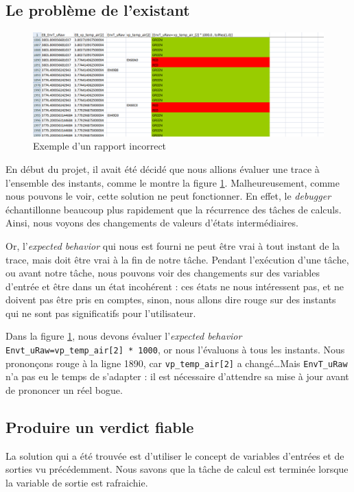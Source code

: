 \subsection{Le problème de l'existant}
\begin{figure}[H]
\centering
\includegraphics[width=1\linewidth]{contents/images/badReport}
\caption{Exemple d'un rapport incorrect}
\label{fig:badReport}
\end{figure}
En début du projet, il avait été décidé que nous allions évaluer une trace à l'ensemble des instants, comme le montre la figure \ref{fig:badReport}. Malheureusement, comme nous pouvons le voir, cette solution ne peut fonctionner. En effet, le \textit{debugger} échantillonne beaucoup plus rapidement que la récurrence des tâches de calculs. Ainsi, nous voyons des changements de valeurs d'états intermédiaires.

Or, l'\textit{expected behavior} qui nous est fourni ne peut être vrai à tout instant de la trace, mais doit être vrai à la fin de notre tâche. Pendant l'exécution d'une tâche, ou avant notre tâche, nous pouvons voir des changements sur des variables d'entrée et être dans un état incohérent : ces états ne nous intéressent pas, et ne doivent pas être pris en comptes, sinon, nous allons dire rouge sur des instants qui ne sont pas significatifs pour l'utilisateur.

Dans la figure \ref{fig:badReport}, nous devons évaluer l'\textit{expected behavior} \texttt{Envt\_uRaw=vp\_temp\_air[2] * 1000}, or nous l'évaluons à tous les instants. Nous prononçons rouge à la ligne 1890, car \texttt{vp\_temp\_air[2]} a changé\ldots Mais \texttt{EnvT\_uRaw} n'a pas eu le temps de s'adapter : il est nécessaire d'attendre sa mise à jour avant de prononcer un réel bogue.

\subsection{Produire un verdict fiable}
La solution qui a été trouvée est d'utiliser le concept de variables d'entrées et de sorties vu précédemment. Nous savons que la tâche de calcul est terminée lorsque la variable de sortie est rafraichie.  

